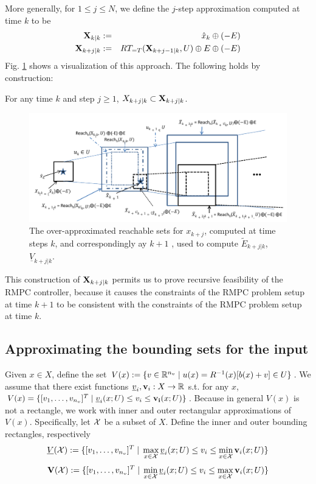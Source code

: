 More generally, for $1 \leq j \leq N$, we define the $j$-step approximation computed at time $k$ to be
 \begin{eqnarray}
 \label{eq:def Xkj}
 \mathbf{X}_{k|k} &:=&   \hat{x}_{k} \oplus (-E) 
 \nonumber
 \\
 \mathbf{X}_{k+j|k} & :=& RT_{=T}(\mathbf{X}_{k+j-1|k},U) \oplus E \oplus (-E) 
 \end{eqnarray}
  Fig. \ref{fig:overreach_NL} shows a visualization of this approach.
 The following holds by construction:
 \begin{lemma}
 	\label{lemma:xreach}
 	For any time $k$ and step $j \geq 1$,
 	$X_{k+j|k} \subset \mathbf{X}_{k+j|k}$.
 \end{lemma}
 
 
 \begin{figure}
 	\includegraphics[scale=0.75]{figs/OverReachFigure_NL_scissored.pdf}
 	\caption{The over-approximated reachable sets for $x_{k+j}$, computed at time steps $k$, and correspondingly ay $k+1$ , used to compute $\tilde{E}_{k+j|k}$, $\underline{V}_{k+j|k}$. }
 	\label{fig:overreach_NL}
 \end{figure}
 
 This construction of $\mathbf{X}_{k+j|k}$ permits us to prove recursive feasibility of the RMPC controller, because it causes the constraints of the RMPC problem setup at time $k+1$ to be consistent with the constraints of the RMPC problem setup at time $k$.

\subsection{Approximating the bounding sets for the input}
\label{sec:approx input sets}
Given $x \in X$, define the set $V(x) := \{v \in \mathbb{R}^{n_v} \;|\; u(x) = R^{-1}(x)[b(x)+v] \in U\}$.
We assume that there exist functions $\underline{v}_i, \mathbf{v}_i: X \rightarrow \mathbb{R}$ s.t. for any $x$, $V(x) = \{[v_1,\ldots,v_{n_v}]^T \;|\; \underline{v}_i(x;U) \leq v_i \leq \mathbf{v_i}(x;U) \}$.
Because in general $V(x)$ is not a rectangle, we work with inner and outer rectangular approximations of $V(x)$.
Specifically, let $\mathcal{X}$ be a subset of $X$.
Define the inner and outer bounding rectangles, respectively
\[\underline{V}(\mathcal{X}) := \{[v_1,\ldots,v_{n_v}]^T \;|\; \max_{x\in \mathcal{X}} \underline{v}_i(x;U)  \leq v_i \leq \min_{x \in \mathcal{X}} \mathbf{v}_i(x;U) \} \]
\[\mathbf{V}(\mathcal{X}) := \{[v_1,\ldots,v_{n_v}]^T \;|\; \min_{x\in \mathcal{X}} \underline{v}_i(x;U)  \leq v_i \leq \max_{x \in \mathcal{X}} \mathbf{v}_i(x;U) \} \]

